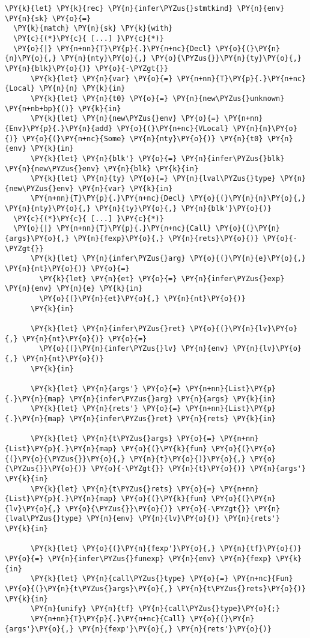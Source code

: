 \begin{Verbatim}[commandchars=\\\{\}]
\PY{k}{let} \PY{k}{rec} \PY{n}{infer\PYZus{}stmtkind} \PY{n}{env} \PY{n}{sk} \PY{o}{=}
  \PY{k}{match} \PY{n}{sk} \PY{k}{with}
  \PY{c}{(*}\PY{c}{ [...] }\PY{c}{*)}
  \PY{o}{|} \PY{n+nn}{T}\PY{p}{.}\PY{n+nc}{Decl} \PY{o}{(}\PY{n}{n}\PY{o}{,} \PY{n}{nty}\PY{o}{,} \PY{o}{\PYZus{}}\PY{n}{ty}\PY{o}{,} \PY{n}{blk}\PY{o}{)} \PY{o}{-\PYZgt{}}
      \PY{k}{let} \PY{n}{var} \PY{o}{=} \PY{n+nn}{T}\PY{p}{.}\PY{n+nc}{Local} \PY{n}{n} \PY{k}{in}
      \PY{k}{let} \PY{n}{t0} \PY{o}{=} \PY{n}{new\PYZus{}unknown} \PY{n+nb+bp}{()} \PY{k}{in}
      \PY{k}{let} \PY{n}{new\PYZus{}env} \PY{o}{=} \PY{n+nn}{Env}\PY{p}{.}\PY{n}{add} \PY{o}{(}\PY{n+nc}{VLocal} \PY{n}{n}\PY{o}{)} \PY{o}{(}\PY{n+nc}{Some} \PY{n}{nty}\PY{o}{)} \PY{n}{t0} \PY{n}{env} \PY{k}{in}
      \PY{k}{let} \PY{n}{blk'} \PY{o}{=} \PY{n}{infer\PYZus{}blk} \PY{n}{new\PYZus{}env} \PY{n}{blk} \PY{k}{in}
      \PY{k}{let} \PY{n}{ty} \PY{o}{=} \PY{n}{lval\PYZus{}type} \PY{n}{new\PYZus{}env} \PY{n}{var} \PY{k}{in}
      \PY{n+nn}{T}\PY{p}{.}\PY{n+nc}{Decl} \PY{o}{(}\PY{n}{n}\PY{o}{,} \PY{n}{nty}\PY{o}{,} \PY{n}{ty}\PY{o}{,} \PY{n}{blk'}\PY{o}{)}
  \PY{c}{(*}\PY{c}{ [...] }\PY{c}{*)}
  \PY{o}{|} \PY{n+nn}{T}\PY{p}{.}\PY{n+nc}{Call} \PY{o}{(}\PY{n}{args}\PY{o}{,} \PY{n}{fexp}\PY{o}{,} \PY{n}{rets}\PY{o}{)} \PY{o}{-\PYZgt{}}
      \PY{k}{let} \PY{n}{infer\PYZus{}arg} \PY{o}{(}\PY{n}{e}\PY{o}{,} \PY{n}{nt}\PY{o}{)} \PY{o}{=}
        \PY{k}{let} \PY{n}{et} \PY{o}{=} \PY{n}{infer\PYZus{}exp} \PY{n}{env} \PY{n}{e} \PY{k}{in}
        \PY{o}{(}\PY{n}{et}\PY{o}{,} \PY{n}{nt}\PY{o}{)}
      \PY{k}{in}

      \PY{k}{let} \PY{n}{infer\PYZus{}ret} \PY{o}{(}\PY{n}{lv}\PY{o}{,} \PY{n}{nt}\PY{o}{)} \PY{o}{=}
        \PY{o}{(}\PY{n}{infer\PYZus{}lv} \PY{n}{env} \PY{n}{lv}\PY{o}{,} \PY{n}{nt}\PY{o}{)}
      \PY{k}{in}

      \PY{k}{let} \PY{n}{args'} \PY{o}{=} \PY{n+nn}{List}\PY{p}{.}\PY{n}{map} \PY{n}{infer\PYZus{}arg} \PY{n}{args} \PY{k}{in}
      \PY{k}{let} \PY{n}{rets'} \PY{o}{=} \PY{n+nn}{List}\PY{p}{.}\PY{n}{map} \PY{n}{infer\PYZus{}ret} \PY{n}{rets} \PY{k}{in}

      \PY{k}{let} \PY{n}{t\PYZus{}args} \PY{o}{=} \PY{n+nn}{List}\PY{p}{.}\PY{n}{map} \PY{o}{(}\PY{k}{fun} \PY{o}{(}\PY{o}{(}\PY{o}{\PYZus{}}\PY{o}{,} \PY{n}{t}\PY{o}{)}\PY{o}{,} \PY{o}{\PYZus{}}\PY{o}{)} \PY{o}{-\PYZgt{}} \PY{n}{t}\PY{o}{)} \PY{n}{args'} \PY{k}{in}
      \PY{k}{let} \PY{n}{t\PYZus{}rets} \PY{o}{=} \PY{n+nn}{List}\PY{p}{.}\PY{n}{map} \PY{o}{(}\PY{k}{fun} \PY{o}{(}\PY{n}{lv}\PY{o}{,} \PY{o}{\PYZus{}}\PY{o}{)} \PY{o}{-\PYZgt{}} \PY{n}{lval\PYZus{}type} \PY{n}{env} \PY{n}{lv}\PY{o}{)} \PY{n}{rets'} \PY{k}{in}

      \PY{k}{let} \PY{o}{(}\PY{n}{fexp'}\PY{o}{,} \PY{n}{tf}\PY{o}{)} \PY{o}{=} \PY{n}{infer\PYZus{}funexp} \PY{n}{env} \PY{n}{fexp} \PY{k}{in}
      \PY{k}{let} \PY{n}{call\PYZus{}type} \PY{o}{=} \PY{n+nc}{Fun} \PY{o}{(}\PY{n}{t\PYZus{}args}\PY{o}{,} \PY{n}{t\PYZus{}rets}\PY{o}{)} \PY{k}{in}
      \PY{n}{unify} \PY{n}{tf} \PY{n}{call\PYZus{}type}\PY{o}{;}
      \PY{n+nn}{T}\PY{p}{.}\PY{n+nc}{Call} \PY{o}{(}\PY{n}{args'}\PY{o}{,} \PY{n}{fexp'}\PY{o}{,} \PY{n}{rets'}\PY{o}{)}
\end{Verbatim}
